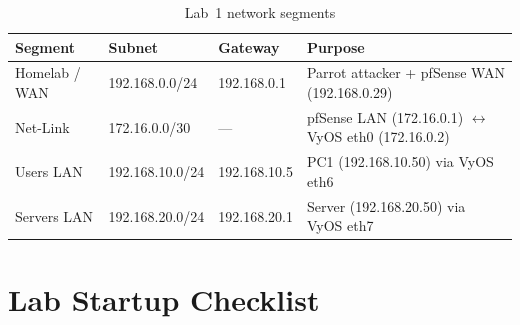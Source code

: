 \begin{table}[H]
\centering
\begin{tabularx}{\textwidth}{lllX}
\toprule
\textbf{Segment} & \textbf{Subnet} & \textbf{Gateway} & \textbf{Purpose} \\
\midrule
Homelab / WAN & 192.168.0.0/24  & 192.168.0.1  & Parrot attacker + pfSense WAN (192.168.0.29)             \\
Net-Link      & 172.16.0.0/30   & ---          & pfSense LAN (172.16.0.1) $\leftrightarrow$ VyOS eth0 (172.16.0.2) \\
Users LAN     & 192.168.10.0/24 & 192.168.10.5 & PC1 (192.168.10.50) via VyOS eth6                        \\
Servers LAN   & 192.168.20.0/24 & 192.168.20.1 & Server (192.168.20.50) via VyOS eth7                     \\
\bottomrule
\end{tabularx}
\caption{Lab~1 network segments}
\label{tab:lab1-segments}
\end{table}

\section*{Lab Startup Checklist}

